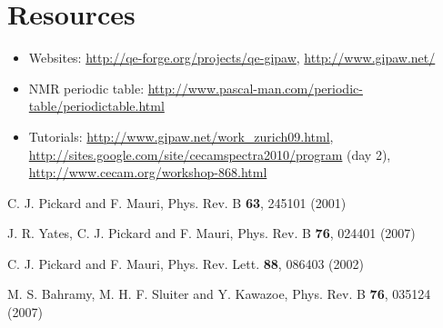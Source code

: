 \documentclass[a4paper,11pt,twoside]{article}
\begin{document}
\section{Resources}
\begin{itemize}
\item Websites: \url{http://qe-forge.org/projects/qe-gipaw}, \url{http://www.gipaw.net/}
\item NMR periodic table: \url{http://www.pascal-man.com/periodic-table/periodictable.html}
\item Tutorials: \url{http://www.gipaw.net/work_zurich09.html},
                 \url{http://sites.google.com/site/cecamspectra2010/program} (day 2),
                 \url{http://www.cecam.org/workshop-868.html}
\end{itemize}


\begin{thebibliography}{99}
  C. J. Pickard and F. Mauri, Phys. Rev. B \textbf{63}, 245101 (2001)

  J. R. Yates, C. J. Pickard and F. Mauri, Phys. Rev. B \textbf{76}, 024401 (2007)

  C. J. Pickard and F. Mauri, Phys. Rev. Lett. \textbf{88}, 086403 (2002)


  M. S. Bahramy, M. H. F. Sluiter and Y. Kawazoe, Phys. Rev. B  \textbf{76}, 035124 (2007)
\end{thebibliography}

\end{document}
